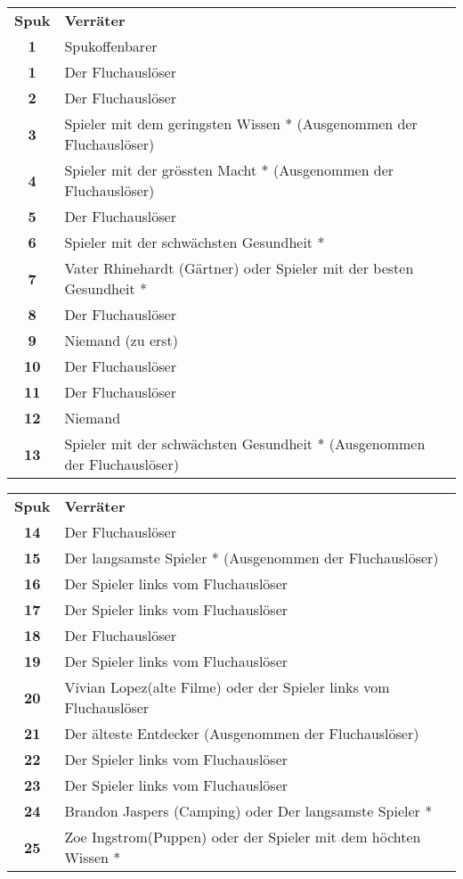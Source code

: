 \begin{landscape}
\vspace{1cm}
\begin{multicols}{2}
\begin{tabular}{cp{11.5cm}}
\textbf{Spuk} & \textbf{Verräter} \\
\bf 1 & Spukoffenbarer \\
\bf 1  & Der Fluchauslöser \\
\bf 2  & Der Fluchauslöser \\
\bf 3  & Spieler mit dem geringsten Wissen * \newline (Ausgenommen der Fluchauslöser) \\
\bf 4  & Spieler mit der grössten Macht * \newline (Ausgenommen der Fluchauslöser) \\
\bf 5  & Der Fluchauslöser \\
\bf 6  & Spieler mit der schwächsten Gesundheit * \\
\bf 7  & Vater Rhinehardt (Gärtner) \newline oder Spieler mit der besten Gesundheit * \\
\bf 8  & Der Fluchauslöser \\
\bf 9  & Niemand (zu erst) \\
\bf 10 & Der Fluchauslöser \\
\bf 11 & Der Fluchauslöser \\
\bf 12 & Niemand \\
\bf 13 & Spieler mit der schwächsten Gesundheit * \newline (Ausgenommen der Fluchauslöser) \\
\end{tabular}
\vfill
\columnbreak
\begin{tabular}{cp{11.5cm}}
\textbf{Spuk} & \textbf{Verräter} \\
\bf 14 & Der Fluchauslöser \\
\bf 15 & Der langsamste Spieler * (Ausgenommen der Fluchauslöser) \\
\bf 16 & Der Spieler links vom Fluchauslöser \\
\bf 17 & Der Spieler links vom Fluchauslöser \\
\bf 18 & Der Fluchauslöser \\
\bf 19 & Der Spieler links vom Fluchauslöser \\
\bf 20 & Vivian Lopez(alte Filme) oder der Spieler links vom Fluchauslöser \\
\bf 21 & Der älteste Entdecker (Ausgenommen der Fluchauslöser) \\
\bf 22 & Der Spieler links vom Fluchauslöser \\
\bf 23 & Der Spieler links vom Fluchauslöser \\
\bf 24 & Brandon Jaspers (Camping) oder Der langsamste Spieler * \\
\bf 25 & Zoe Ingstrom(Puppen) oder der Spieler mit dem höchten Wissen * \\
\end{tabular}


\end{multicols}
\end{landscape}
